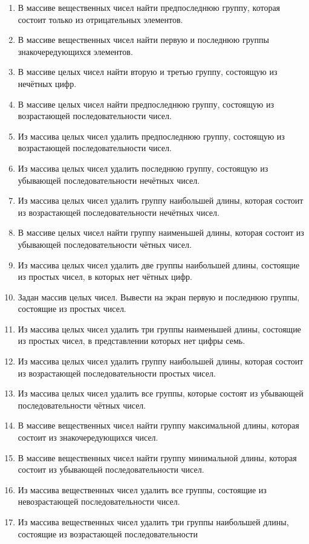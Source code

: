 \begin{enumerate}
\item В массиве вещественных чисел найти предпоследнюю группу, которая состоит только из отрицательных элементов.
\item В массиве вещественных чисел найти первую и последнюю группы знакочередующихся элементов.
\item В массиве целых чисел найти вторую и третью группу, состоящую из нечётных цифр.
\item В массиве целых чисел найти предпоследнюю группу, состоящую из возрастающей последовательности чисел.
\item Из массива целых чисел удалить предпоследнюю группу, состоящую из возрастающей последовательности чисел.
\item Из массива целых чисел удалить последнюю группу, состоящую из убывающей последовательности нечётных чисел.
\item Из массива целых чисел удалить группу наибольшей длины, которая состоит из возрастающей последовательности
нечётных чисел.
\item В массиве целых чисел найти группу наименьшей длины, которая состоит из убывающей последовательности чётных чисел.
\item Из массива целых чисел удалить две группы наибольшей длины, состоящие из простых чисел, в которых нет чётных цифр.
\item Задан массив целых чисел. Вывести на экран первую и последнюю группы, состоящие из простых чисел.
\item Из массива целых чисел удалить три группы наименьшей длины, состоящие из простых чисел, в представлении которых
нет цифры семь.
\item Из массива целых чисел удалить группу наибольшей длины, которая состоит из возрастающей последовательности простых
чисел.
\item Из массива целых чисел удалить все группы, которые состоят из убывающей последовательности чётных чисел.
\item В массиве вещественных чисел найти группу максимальной длины, которая состоит из знакочередующихся чисел.
\item В массиве вещественных чисел найти группу минимальной длины, которая состоит из убывающей последовательности
чисел.
\item Из массива вещественных чисел удалить все группы, состоящие из невозрастающей последовательности чисел.
\item Из массива вещественных чисел удалить три группы наибольшей длины, состоящие из возрастающей последовательности

\end{enumerate}
